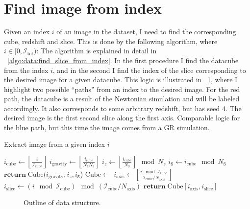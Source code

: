 \section{Find image from index}
    Given an index $i$ of an image in the dataset, I need to find the corresponding cube, redshift and slice. This is done by the following algorithm, where $i\in[0, \mathcal{I}_\mathrm{tot})$: The algorithm is explained in detail in ~\cref{algo:data:find_slice_from_index}. In the first procedure I find the datacube from the index $i$, and in the second I find the index of the slice corresponding to the desired image for a given datacube. This logic is illustrated in ~\cref{fig:data:illustration_of_dataset}, where I highlight two possible ``paths'' from an index to the desired image. For the red path, the datacube is a result of the Newtonian simulation and will be labeled accordingly. It also corresponds to some arbitrary redshift, but has seed 4. The desired image is the first second slice along the first axis. Comparable logic for the blue path, but this time the image comes from a GR simulation. 
    \begin{algorithm}
        \caption{Extract image from a given index $i$}\label{algo:data:find_slice_from_index}
        \begin{algorithmic}
                \State $i_\mathrm{cube} \gets \left\lfloor\frac{i}{\mathcal{I}_\mathrm{cube}}\right\rfloor$ 
                \State $i_\mathrm{gravity} \gets \left\lfloor\frac{i_\mathrm{cube}}{N_zN_\mathtt{S}}\right\rfloor$ 
                \State $i_z \gets \left\lfloor\frac{i_\mathrm{cube}}{N_\mathtt{S}}\right\rfloor \mod N_z$ 
                \State $i_\mathtt{S} \gets i_\mathrm{cube}\mod N_\mathtt{S}$ 
                \State $\mathbf{return}\; \mathrm{Cube}(i_\mathrm{gravity}, i_z, i_\mathtt{S}$) 
            \EndProcedure
                \State $\mathrm{Cube} \gets$ 
                \State $i_\mathrm{axis} \gets \left\lfloor\frac{i \mod \mathcal{I}_\mathrm{cube}}{\mathcal{I}_\mathrm{cube}/N_\mathrm{axis}}\right\rfloor$ 
                \State $i_\mathrm{slice} \gets (i \mod \mathcal{I}_\mathrm{cube}) \mod (\mathcal{I}_\mathrm{cube}/N_\mathrm{axis})$ 
                \State $\mathbf{return}\; \mathrm{Cube}[i_\mathrm{axis}, i_\mathrm{slice}]$ 
            \EndProcedure
        \end{algorithmic}
    \end{algorithm}



    \begin{figure}\label{fig:data:illustration_of_dataset}
        \centering
        
        \caption{Outline of data structure.}
    \end{figure}